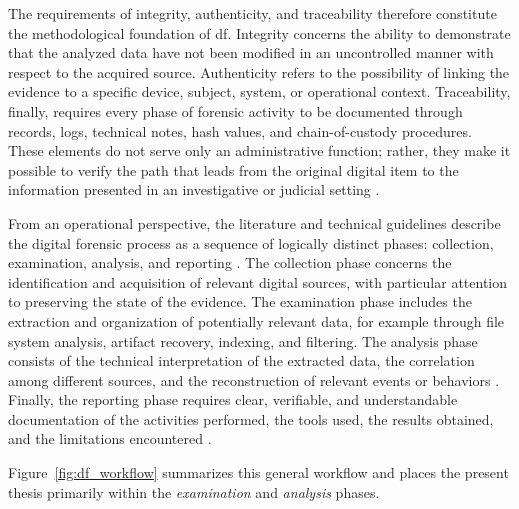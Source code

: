 The requirements of integrity, authenticity, and traceability therefore
constitute the methodological foundation of \gls{df}. Integrity concerns the
ability to demonstrate that the analyzed data have not been modified in an
uncontrolled manner with respect to the acquired source. Authenticity refers to
the possibility of linking the evidence to a specific device, subject, system,
or operational context. Traceability, finally, requires every phase of forensic
activity to be documented through records, logs, technical notes, hash values,
and chain-of-custody procedures. These elements do not serve only an
administrative function; rather, they make it possible to verify the path that
leads from the original digital item to the information presented in an
investigative or judicial setting
\cite{iso27037,enfsi2022,swgde_guidelines,acpo_guidelines}.

From an operational perspective, the literature and technical guidelines
describe the digital forensic process as a sequence of logically distinct
phases: collection, examination, analysis, and reporting \cite{iso27043}. The collection phase
concerns the identification and acquisition of relevant digital sources, with
particular attention to preserving the state of the evidence. The examination
phase includes the extraction and organization of potentially relevant data,
for example through file system analysis, artifact recovery, indexing, and
filtering. The analysis phase consists of the technical interpretation of the
extracted data, the correlation among different sources, and the reconstruction
of relevant events or behaviors \cite{iso27042}. Finally, the reporting phase
requires clear,
verifiable, and understandable documentation of the activities performed, the
tools used, the results obtained, and the limitations encountered
\cite{reith2002examining,nist2006guide,casey2011digital,carrier2005filesystem}.


Figure~\ref{fig:df_workflow} summarizes this general workflow and places the
present thesis primarily within the \textit{examination} and \textit{analysis}
phases.

